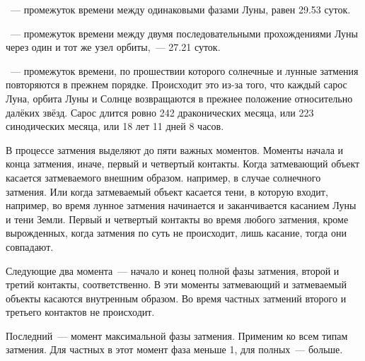 ~--- промежуток времени между одинаковыми фазами Луны, равен 29.53 суток.

~--- промежуток времени между двумя последовательными прохождениями Луны через один и тот же узел орбиты,~--- 27.21 суток.

~--- промежуток  времени, по прошествии которого солнечные и лунные затмения повторяются в прежнем порядке. Происходит это из-за того, что каждый сарос Луна, орбита Луны и Солнце возвращаются в прежнее положение относительно далёких звёзд. Сарос длится ровно 242 драконических месяца, или 223 синодических месяца, или 18 лет 11 дней 8 часов.

В процессе затмения выделяют до пяти важных моментов. Моменты начала и конца затмения, иначе, первый и четвертый контакты. Когда затмевающий объект касается затмеваемого внешним образом. например, в случае солнечного затмения. Или когда затмеваемый объект касается тени, в которую входит, например, во время лунное затмения начинается и заканчивается касанием Луны и тени Земли. Первый и четвертый контакты во время любого затмения, кроме вырожденных, когда затмения по суть не происходит, лишь касание, тогда они совпадают.

Следующие два момента~--- начало и конец полной фазы затмения, второй и третий контакты, соответственно. В эти моменты затмевающий и затмеваемый объекты касаются внутренным образом. Во время частных затмений второго и третьего контактов не происходит.

Последний~--- момент максимальной фазы затмения. Применим ко всем типам затмения. Для частных в этот момент фаза меньше 1, для полных~--- больше.


